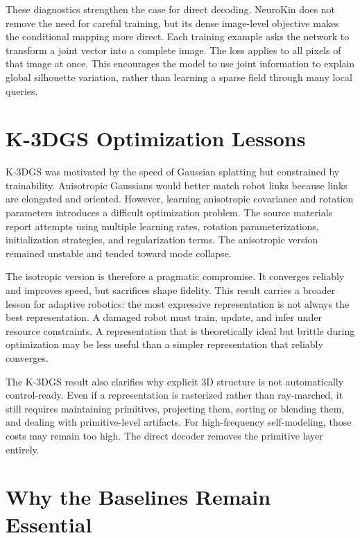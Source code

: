 \documentclass[12pt,a4paper,oneside]{report}
\begin{document}
These diagnostics strengthen the case for direct decoding. NeuroKin does not remove the need for careful training, but its dense image-level objective makes the conditional mapping more direct. Each training example asks the network to transform a joint vector into a complete image. The loss applies to all pixels of that image at once. This encourages the model to use joint information to explain global silhouette variation, rather than learning a sparse field through many local queries.

\section{K-3DGS Optimization Lessons}

K-3DGS was motivated by the speed of Gaussian splatting but constrained by trainability. Anisotropic Gaussians would better match robot links because links are elongated and oriented. However, learning anisotropic covariance and rotation parameters introduces a difficult optimization problem. The source materials report attempts using multiple learning rates, rotation parameterizations, initialization strategies, and regularization terms. The anisotropic version remained unstable and tended toward mode collapse.

The isotropic version is therefore a pragmatic compromise. It converges reliably and improves speed, but sacrifices shape fidelity. This result carries a broader lesson for adaptive robotics: the most expressive representation is not always the best representation. A damaged robot must train, update, and infer under resource constraints. A representation that is theoretically ideal but brittle during optimization may be less useful than a simpler representation that reliably converges.

The K-3DGS result also clarifies why explicit 3D structure is not automatically control-ready. Even if a representation is rasterized rather than ray-marched, it still requires maintaining primitives, projecting them, sorting or blending them, and dealing with primitive-level artifacts. For high-frequency self-modeling, those costs may remain too high. The direct decoder removes the primitive layer entirely.

\section{Why the Baselines Remain Essential}
\end{document}
